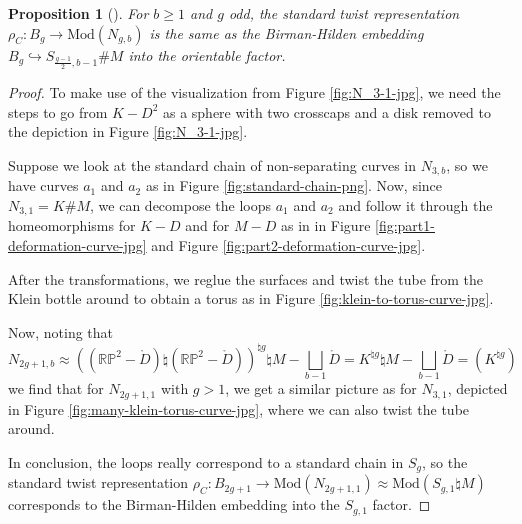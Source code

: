 \documentclass[reqno]{amsart}
\newtheorem{proposition}[theorem]{Proposition}
\theoremstyle{definition}
\theoremstyle{remark}
\newcommand{\Mod}{{\mathrm{Mod}}}
\begin{document}
\begin{proposition}[]\label{standard-twist-birman-hilden}
    For $b\ge 1$ and
    $g$ odd, the standard twist representation
    $\rho_{C} \colon B_g \to \Mod (N_{g,b})$ is the
    same as the Birman-Hilden embedding
    $B_g \hookrightarrow S_{\frac{g-1}{2}, b-1} \# M $
    into the orientable factor.
\end{proposition}

\begin{proof}

To make use of the visualization from Figure
\ref{fig:N_3-1-jpg}, we need the steps to go from 
$K - D^2$ as a sphere with two crosscaps and a disk removed
to the depiction in Figure \ref{fig:N_3-1-jpg}.

Suppose we look at the standard chain of non-separating curves
in $N_{3,b}$, so we have curves $a_1$ and $a_2$ as
in Figure \ref{fig:standard-chain-png}.
Now, since
 $N_{3,1} = K \# M $, we can decompose the loops
 $a_1$ and $a_2$ and follow
 it through the homeomorphisms for
 $K - D$ and for $M - D$ as in 
 in Figure \ref{fig:part1-deformation-curve-jpg} and
 Figure \ref{fig:part2-deformation-curve-jpg}.

 After the transformations, we reglue the surfaces
 and twist
 the tube from the Klein bottle around
 to obtain a torus 
 as in Figure \ref{fig:klein-to-torus-curve-jpg}.

 Now, noting that 
 \[
 N_{2g+1,b}
 \approx 
 \left( \left( \mathbb{R}\mathbb{P}^2 - \mathring{D} \right)
\natural \left( \mathbb{R}\mathbb{P}^2 
- \mathring{D} \right)\right)^{\natural g}
\natural M - \bigsqcup_{b-1} \mathring{D} 
= K^{\natural g} \natural M - 
\bigsqcup_{b-1} \mathring{D}
= \left( K^{\natural g} \right) 
\]
we find that for $N_{2g+1,1}$ with $g>1$, we get a similar
picture as for $N_{3,1}$, depicted in Figure
\ref{fig:many-klein-torus-curve-jpg}, where
we can also twist the tube around.

In conclusion, the loops really correspond to a
standard chain in $S_g$, so the
standard twist representation
$\rho_{C} \colon
B_{2g+1} \to \Mod \left( N_{2g+1,1} \right) 
\approx \Mod \left( S_{g,1} \natural M \right) $ 
corresponds to the Birman-Hilden embedding
into the $S_{g,1}$ factor.




\end{proof}
\end{document}
